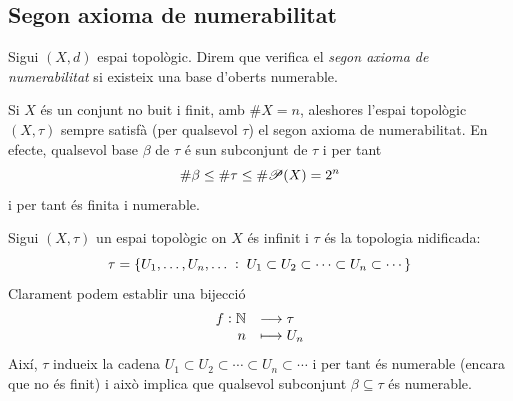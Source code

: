 \documentclass[../main.tex]{subfiles}
\begin{document}
\subsection{Segon axioma de numerabilitat}
\begin{defi}
\label{def:2an} Sigui $(X,d)$ espai topològic. Direm que verifica el \textit{segon axioma de numerabilitat} si existeix una base d'oberts numerable.
\end{defi}

\begin{ej}
\label{ej:2an1} Si $X$ és un conjunt no buit i finit, amb $\#X= n$, aleshores l'espai topològic $(X,\tau)$ sempre satisfà (per qualsevol $\tau$) el segon axioma de numerabilitat. En efecte, qualsevol base $\beta$ de $\tau$ é sun subconjunt de $\tau$ i per tant
\begin{equation}
    \notag
    \#\beta\leq\#\tau\leq\#\mathscr{P}(X) = 2^n
\end{equation}
i per tant és finita i numerable.
\end{ej}

\begin{ej}
\label{ej:2an2} Sigui $(X,\tau)$ un espai topològic on $X$ és infinit i $\tau$ és la topologia nidificada:
\begin{equation}
    \notag
    \tau = \{U_1,\ldots,U_n,\ldots\;:\;U_1\subset U_2\subset\cdots\subset U_n\subset\cdots\}
\end{equation}
Clarament podem establir una bijecció 
\begin{equation}
    \notag
    \begin{array}{rl}
        f:\mathbb{N} & \longrightarrow \tau \\
        n & \longmapsto U_n
    \end{array}
\end{equation}
Així, $\tau$ indueix la cadena $U_1\subset U_2\subset\cdots\subset U_n\subset\cdots$ i per tant és numerable (encara que no és finit) i això implica que qualsevol subconjunt $\beta\subseteq\tau$ és numerable.
\end{ej}
\end{document}
